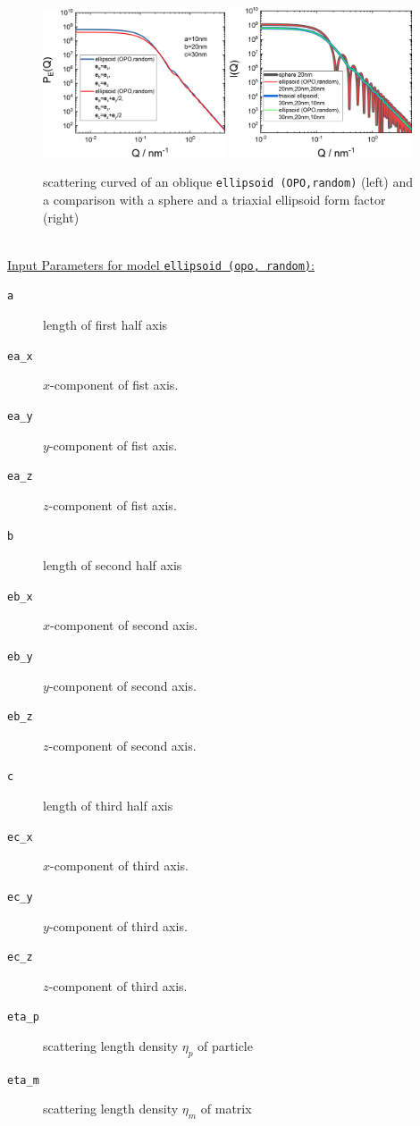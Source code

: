 \begin{figure}[htb]
\includegraphics[width=0.481\textwidth]{../images/form_factor/oriented_primitive_opbjects/ellipsoidOPOoblique.png} \hfill
\includegraphics[width=0.481\textwidth]{../images/form_factor/oriented_primitive_opbjects/ellipsoidOPOcompare.png}
\caption{scattering curved of an oblique \texttt{ellipsoid (OPO,random)} (left) and a comparison with a sphere and a triaxial ellipsoid form factor (right)}
\label{fig:opo_ellipsoidIQrandom}
\end{figure}

~\\
\underline{Input Parameters for model \texttt{ellipsoid (opo, random)}:}
\begin{description}
\item[\texttt{a}] length of first half axis
\item[\texttt{ea\_x}] $x$-component of fist axis.
\item[\texttt{ea\_y}] $y$-component of fist axis.
\item[\texttt{ea\_z}] $z$-component of fist axis.
\item[\texttt{b}] length of second half axis
\item[\texttt{eb\_x}] $x$-component of second axis.
\item[\texttt{eb\_y}] $y$-component of second axis.
\item[\texttt{eb\_z}] $z$-component of second axis.
\item[\texttt{c}] length of third half axis
\item[\texttt{ec\_x}] $x$-component of third axis.
\item[\texttt{ec\_y}] $y$-component of third axis.
\item[\texttt{ec\_z}] $z$-component of third axis.
\item[\texttt{eta\_p}] scattering length density $\eta_p$ of particle
\item[\texttt{eta\_m}] scattering length density $\eta_m$ of matrix
\end{description}


